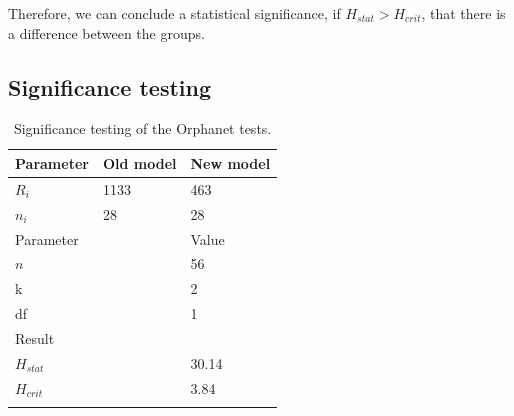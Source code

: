 \documentclass[10pt,letterpaper,final]{article}
\begin{document}
Therefore, we can conclude a statistical significance, if $H_{stat} >
H_{crit}$, that there is a difference between the groups.


\subsection{Significance testing}
\begin{table}[here]
\begin{center}
\begin{tabular}{lll}
    Parameter & Old model & New model \\ \hline
    $R_{i}$ & 1133 & 463 \\
    $n_{i}$ & 28 & 28 \\ \hline\hline
    Parameter & & Value \\ \hline
    $n$ && 56  \\
    k && 2  \\
    df && 1  \\ \hline \hline
    Result & & \\\hline
    $H_{stat}$ & & 30.14 \\
    $H_{crit}$ & & 3.84 \\
    \label{tab:orpha_old_new}
\end{tabular}
    \caption{Significance testing of the Orphanet tests.}
\end{center}
\end{table}


\end{document}
